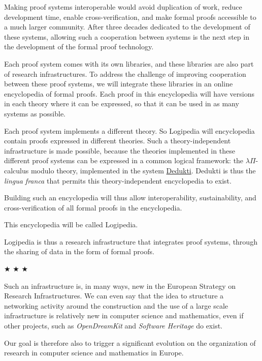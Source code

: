 Making proof systems interoperable would avoid duplication of work,
reduce development time, enable cross-verification, and make formal
proofs accessible to a much larger community.  After three decades
dedicated to the development of these systems, allowing such a
cooperation between systems is the next step in the development of the
formal proof technology.

Each proof system comes with its own libraries, and these libraries
are also part of research infrastructures. To address the challenge of
improving cooperation between these proof systems, we will integrate
these libraries in an online encyclopedia of formal proofs. Each proof
in this encyclopedia will have versions in each theory where it can be
expressed, so that it can be used in as many systems as possible.

Each proof system implements a different theory. So Logipedia will
encyclopedia contain proofs expressed in different theories.  Such a
theory-independent infrastructure is made possible, because the
theories implemented in these different proof systems can be expressed
in a common logical framework: the $\lambda \Pi$-calculus modulo
theory, implemented in the system \href{https://deducteam.github.io/}{Dedukti}. Dedukti is thus the {\em
lingua franca} that permits this theory-independent encyclopedia to 
exist.

Building such an encyclopedia will thus allow interoperability,
sustainability, and cross-verification of all formal proofs in the
encyclopedia.

This encyclopedia will be called Logipedia.

Logipedia is thus a research infrastructure that integrates proof
systems, through the sharing of data in the form of formal proofs.

\begin{center}
$\bigstar$ $\bigstar$ $\bigstar$
\end{center}

Such an infrastructure is, in many ways, new in the European Strategy
on Research Infrastructures. We can even say that the idea to
structure a networking activity around the construction and the use of
a large scale infrastructure is relatively new in computer science and
mathematics, even if other projects, such as {\em OpenDreamKit} and
{\em Software Heritage} do exist.

Our goal is therefore also to trigger a
significant evolution on the organization of research in
computer science and mathematics in Europe.

